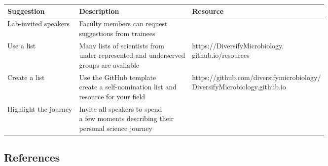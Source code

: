 \documentclass[10pt,]{article}
\begin{document}
\begin{center}
\small
\begin{tabular}{|l|l|l|}
\hline

\rowcolor{lightgray}
\textbf{Suggestion} & \textbf{Description} & \textbf{Resource} \\ \hline

Lab-invited speakers & \makecell[l]{Faculty members can request \\suggestions from trainees} & \\ \hline

Use a list & \makecell[l]{Many lists of scientists from \\under-represented and underserved \\groups are available} &  \makecell[l]{https://DiversifyMicrobiology.\\github.io/resources}\\ \hline

Create a list & \makecell[l]{Use the GitHub template \\ create a self-nomination list and \\resource for your field} & \makecell[l]{https://github.com/diversifymicrobiology/\\DiversifyMicrobiology.github.io} \\ \hline

Highlight the journey & \makecell[l]{Invite all speakers to spend \\a few moments describing their \\personal science journey} & \\ \hline

\end{tabular}
\end{center}

\newpage

\subsection{References}\label{references}

\hypertarget{refs}{}
\end{document}
